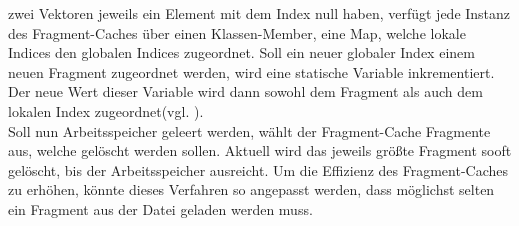 zwei Vektoren jeweils ein Element mit dem Index null haben, verfügt jede Instanz des Fragment-Caches über einen Klassen-Member, eine Map, welche lokale Indices den globalen Indices zugeordnet. Soll ein neuer globaler Index einem neuen Fragment zugeordnet werden, wird eine statische Variable inkrementiert. Der neue Wert dieser Variable wird dann sowohl dem Fragment als auch dem lokalen Index zugeordnet(vgl. ).\\ Soll nun Arbeitsspeicher geleert werden, wählt der Fragment-Cache Fragmente aus, welche gelöscht werden sollen. Aktuell wird das jeweils größte Fragment sooft gelöscht, bis der Arbeitsspeicher ausreicht. Um die Effizienz des Fragment-Caches zu erhöhen, könnte dieses Verfahren so angepasst werden, dass möglichst selten ein Fragment aus der Datei geladen werden muss.